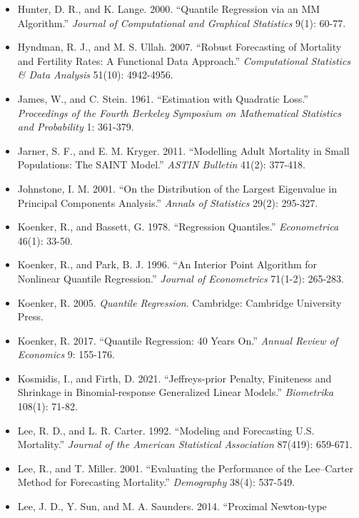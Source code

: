 \documentclass[UTF8, fontset=macnew, a4paper, 12pt]{ctexart}
\begin{document}
\begin{itemize}[leftmargin=2em, label={}, itemsep=3pt]
  \item[] Hunter, D. R., and K. Lange. 2000. ``Quantile Regression via an MM
        Algorithm.'' \textit{Journal of Computational and Graphical Statistics}
        9(1): 60-77.
  \item[] Hyndman, R. J., and M. S. Ullah. 2007. ``Robust Forecasting of
        Mortality and Fertility Rates: A Functional Data Approach.''
        \textit{Computational Statistics \& Data Analysis} 51(10): 4942-4956.
  \item[] James, W., and C. Stein. 1961. ``Estimation with Quadratic Loss.''
        \textit{Proceedings of the Fourth Berkeley Symposium on Mathematical
        Statistics and Probability} 1: 361-379.
  \item[] Jarner, S. F., and E. M. Kryger. 2011. ``Modelling Adult Mortality in
        Small Populations: The SAINT Model.''
        \textit{ASTIN Bulletin} 41(2): 377-418.
  \item[] Johnstone, I. M. 2001. ``On the Distribution of the Largest Eigenvalue in
        Principal Components Analysis.'' \textit{Annals of Statistics} 29(2): 295-327.
  \item[] Koenker, R., and Bassett, G. 1978. ``Regression Quantiles.''
        \textit{Econometrica} 46(1): 33-50.
  \item[] Koenker, R., and Park, B. J. 1996. ``An Interior Point Algorithm for Nonlinear
        Quantile Regression.'' \textit{Journal of Econometrics} 71(1-2): 265-283.
  \item[] Koenker, R. 2005. \textit{Quantile Regression}. Cambridge: Cambridge
        University Press.
  \item[] Koenker, R. 2017. ``Quantile Regression: 40 Years On.''
        \textit{Annual Review of Economics} 9: 155-176.
  \item[] Kosmidis, I., and Firth, D. 2021. ``Jeffreys-prior Penalty, Finiteness and
        Shrinkage in Binomial-response Generalized Linear Models.''
        \textit{Biometrika} 108(1): 71-82.
  \item[] Lee, R. D., and L. R. Carter. 1992. ``Modeling and Forecasting U.S.
        Mortality.'' \textit{Journal of the American Statistical Association}
        87(419): 659-671.
  \item[] Lee, R., and T. Miller. 2001. ``Evaluating the Performance of the
        Lee--Carter Method for Forecasting Mortality.''
        \textit{Demography} 38(4): 537-549.
  \item[] Lee, J. D., Y. Sun, and M. A. Saunders. 2014. ``Proximal Newton-type

\end{itemize}
\end{document}
